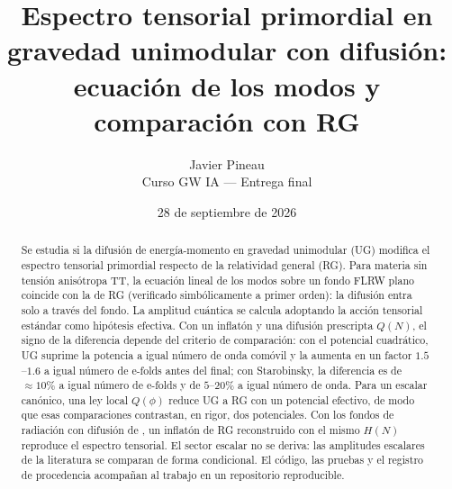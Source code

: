 \documentclass[11pt,a4paper]{article}
\title{\textbf{Espectro tensorial primordial en gravedad unimodular con difusi\'on:\\ ecuaci\'on de los modos y comparaci\'on con RG}}
\author{Javier Pineau\\ \small Curso GW IA --- Entrega final}
\date{28 de septiembre de 2026}
\numberwithin{equation}{section}
\begin{document}
\maketitle
\begin{abstract}
\noindent
Se estudia si la difusión de energía-momento en gravedad unimodular (UG) modifica el espectro tensorial primordial respecto de la relatividad general (RG). Para materia sin tensión anisótropa TT, la ecuación lineal de los modos sobre un fondo FLRW plano coincide con la de RG (verificado simbólicamente a primer orden): la difusión entra solo a través del fondo. La amplitud cuántica se calcula adoptando la acción tensorial estándar como hipótesis efectiva. Con un inflatón y una difusión prescripta $Q(N)$, el signo de la diferencia depende del criterio de comparación: con el potencial cuadrático, UG suprime la potencia a igual número de onda comóvil y la aumenta en un factor $1.5$--$1.6$ a igual número de e-folds antes del final; con Starobinsky, la diferencia es de $\approx10\%$ a igual número de e-folds y de $5$--$20\%$ a igual número de onda. Para un escalar canónico, una ley local $Q(\phi)$ reduce UG a RG con un potencial efectivo, de modo que esas comparaciones contrastan, en rigor, dos potenciales. Con los fondos de radiación con difusión de \cite{leon22,piccirilli23}, un inflatón de RG reconstruido con el mismo $H(N)$ reproduce el espectro tensorial. El sector escalar no se deriva: las amplitudes escalares de la literatura se comparan de forma condicional. El código, las pruebas y el registro de procedencia acompañan al trabajo en un repositorio reproducible.
\end{abstract}
\end{document}
